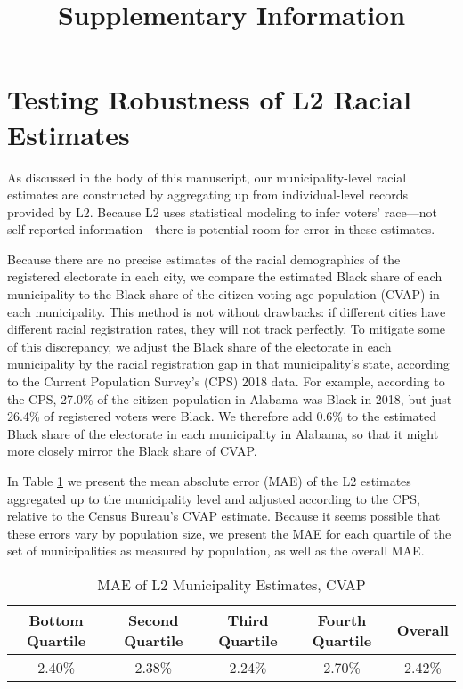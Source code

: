 \documentclass[
  12pt,
]{article}
\title{Supplementary Information}
\author{}
\date{\vspace{-2.5em}}
\begin{document}
\maketitle

\doublespacing

\hypertarget{testing-robustness-of-l2-racial-estimates}{%
\section*{Testing Robustness of L2 Racial Estimates}\label{testing-robustness-of-l2-racial-estimates}}

As discussed in the body of this manuscript, our municipality-level racial estimates are constructed by aggregating up from individual-level records provided by L2. Because L2 uses statistical modeling to infer voters' race---not self-reported information---there is potential room for error in these estimates.

Because there are no precise estimates of the racial demographics of the registered electorate in each city, we compare the estimated Black share of each municipality to the Black share of the citizen voting age population (CVAP) in each municipality. This method is not without drawbacks: if different cities have different racial registration rates, they will not track perfectly. To mitigate some of this discrepancy, we adjust the Black share of the electorate in each municipality by the racial registration gap in that municipality's state, according to the Current Population Survey's (CPS) 2018 data. For example, according to the CPS, 27.0\% of the citizen population in Alabama was Black in 2018, but just 26.4\% of registered voters were Black. We therefore add 0.6\% to the estimated Black share of the electorate in each municipality in Alabama, so that it might more closely mirror the Black share of CVAP.

In Table \ref{tab:mae} we present the mean absolute error (MAE) of the L2 estimates aggregated up to the municipality level and adjusted according to the CPS, relative to the Census Bureau's CVAP estimate. Because it seems possible that these errors vary by population size, we present the MAE for each quartile of the set of municipalities as measured by population, as well as the overall MAE.

\begin{singlespace}
\begin{table}[H]

\caption{\label{tab:mae-chunck}\label{tab:mae} MAE of L2 Municipality Estimates, CVAP}
\centering
\begin{tabular}[t]{ccccc}
\toprule
Bottom Quartile & Second Quartile & Third Quartile & Fourth Quartile & Overall\\
\midrule
2.40\% & 2.38\% & 2.24\% & 2.70\% & 2.42\%\\
\bottomrule
\end{tabular}
\end{table}
\end{singlespace}
\end{document}
